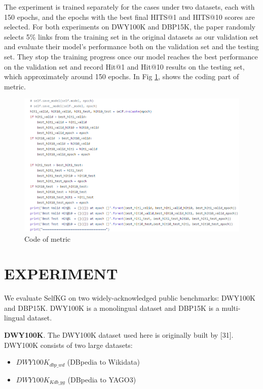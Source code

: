 \documentclass[sigconf]{acmart}
\begin{document}
{The experiment is trained separately for the cases under two datasets, each with 150 epochs, and the epochs with the best final HITS@1 and HITS@10 scores are selected. For both experiments on DWY100K and DBP15K, the paper randomly selects 5\% links from the training set in the original datasets as our validation set and evaluate their model’s performance both on the validation set and the testing set. They stop the training progress once our model reaches the best performance on the validation set and record Hit@1 and Hit@10 results on the testing set, which approximately around 150 epochs. In Fig \ref{metric}, shows the coding part of metric.
\begin{figure}
    \centering
    \includegraphics[width=1\linewidth]{figure/metric.png}
    \caption{Code of metric}
    \label{metric}
\end{figure}

\section{EXPERIMENT}

We evaluate SelfKG on two widely-acknowledged public benchmarks: DWY100K and DBP15K. DWY100K is a monolingual dataset and DBP15K is a multi-lingual dataset.

{\bfseries DWY100K}. The DWY100K dataset used here is originally built by [31]. DWY100K consists of two large datasets: 

\begin{itemize}
\item $DWY100K_{dbp\_wd}$ (DBpedia to Wikidata) 
\item $DWY100K_{Kdb\_yg}$ (DBpedia to YAGO3)
\end{itemize}

}
\end{document}
